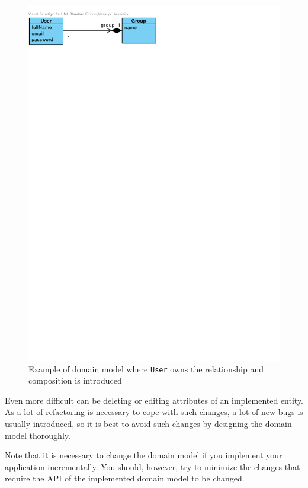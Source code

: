 \begin{figure}[h]
    \centering
        \includegraphics[trim=0 740 290 30, clip, keepaspectratio]{./images/user-owner-group-example.pdf}
    \caption{Example of domain model where \texttt{User} owns the relationship and composition is introduced}
    \label{fig:user-owner-group-example}
\end{figure}

Even more difficult can be deleting or editing attributes of an implemented entity. As a lot of refactoring is necessary to cope with such changes, a lot of new bugs is usually introduced, so it is best to avoid such changes by designing the domain model thoroughly.

Note that it is necessary to change the domain model if you implement your application incrementally. You should, however, try to minimize the changes that require the API of the implemented domain model to be changed.

